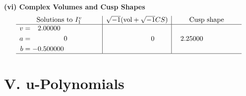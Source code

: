 \documentclass[1p]{elsarticle_modified}
\theoremstyle{definition}
\newcommand{\I}{\sqrt{-1}}
\begin{document}
\newpage\flushleft \textbf{(vi) Complex Volumes and Cusp Shapes}
$$\begin{array}{c|c|c}  
\text{Solutions to }I^v_{1}& \I (\text{vol} + \sqrt{-1}CS) & \text{Cusp shape}\\
 \hline 
\begin{aligned}
v &= \phantom{-}2.00000\phantom{ +0.000000I} \\
a &= \phantom{-0.000000 } 0 \\
b &= -0.500000\phantom{ +0.000000I}\end{aligned}
 & \phantom{-0.000000 } 0 & \phantom{-}2.25000\phantom{ +0.000000I}\\
 \hline 
 \end{array}$$\newpage
\newpage\renewcommand{\arraystretch}{1}
\centering \section*{ V. u-Polynomials}
\end{document}
